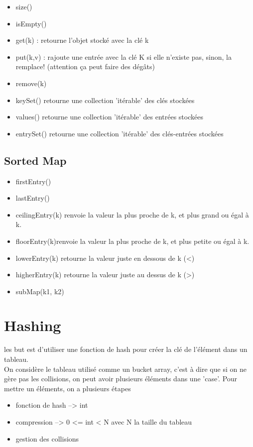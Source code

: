 \documentclass[a4paper]{article}
\begin{document}
\begin{itemize}
\item size()
\item isEmpty()
\item get(k) : retourne l'objet stocké avec la clé k
\item put(k,v) : rajoute une entrée avec la clé K si elle n'existe pas, sinon, la remplace! (attention ça peut faire des dégâts)
\item remove(k)
\item keySet() retourne une collection 'itérable' des clés stockées
\item values() retourne une collection 'itérable' des entrées stockées 
\item entrySet() retourne une collection 'itérable' des clés-entrées stockées
\end{itemize}

\subsection{Sorted Map}
\begin{itemize}
\item firstEntry()
\item lastEntry()
\item ceilingEntry(k) renvoie la valeur la plus proche de k, et plus grand ou égal à k.
\item floorEntry(k)renvoie la valeur la plus proche de k, et plus petite ou égal à k.
\item lowerEntry(k) retourne la valeur juste en dessous de k (<)
\item higherEntry(k) retourne la valeur juste au dessus de k (>)
\item subMap(k1, k2)
\end{itemize}


\section{Hashing}
les but est d'utiliser une fonction de hash pour créer la clé de l'élément dans un tableau.\\
On considère le tableau utilisé comme un bucket array, c'est à dire que si on ne gère pas les collisions, on peut avoir plusieurs éléments dans une 'case'. Pour mettre un éléments, on a plusieurs étapes
\begin{itemize}
\item fonction de hash --> int
\item compression --> 0 <= int < N avec N la taille du tableau
\item gestion des collisions
\end{itemize}
\end{document}
